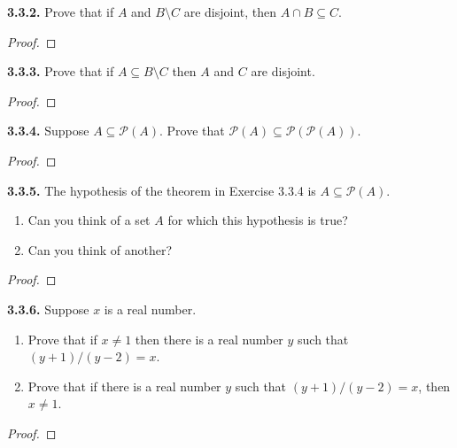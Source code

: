 \documentclass[12pt]{amsart}
\newenvironment{statement}[1]{\smallskip\noindent\color[rgb]{.6627, .3529, .6314} {\bf #1.}}{}
\theoremstyle{definition}
\theoremstyle{remark}
\begin{document}
\begin{statement}{3.3.2}
Prove that if $A$ and $B \setminus C$ are disjoint, then $A \cap B \subseteq C$.
\end{statement}

\begin{proof}
\end{proof}


\begin{statement}{3.3.3}
Prove that if $A \subseteq B \setminus C$ then $A$ and $C$ are disjoint.
\end{statement}

\begin{proof}
\end{proof}


\begin{statement}{3.3.4}
Suppose $A \subseteq \mathscr{P}(A)$.
Prove that $\mathscr{P}(A) \subseteq \mathscr{P}(\mathscr{P}(A))$.
\end{statement}

\begin{proof}
\end{proof}


\begin{statement}{3.3.5}
The hypothesis of the theorem in Exercise 3.3.4 is $A \subseteq \mathscr{P}(A)$.
\begin{enumerate}
	\item Can you think of a set $A$ for which this hypothesis is true?
	
	\item Can you think of another?
\end{enumerate}
\end{statement}

\begin{proof}
\end{proof}


\begin{statement}{3.3.6}
Suppose $x$ is a real number.
\begin{enumerate}
	\item Prove that if $x \neq 1$ then there is a real number $y$ such that $(y + 1)/(y - 2) = x$.
	
	\item Prove that if there is a real number $y$ such that $(y + 1)/(y - 2) = x$, then $x \neq 1$.
\end{enumerate}
\end{statement}

\begin{proof}
\end{proof}
\end{document}
